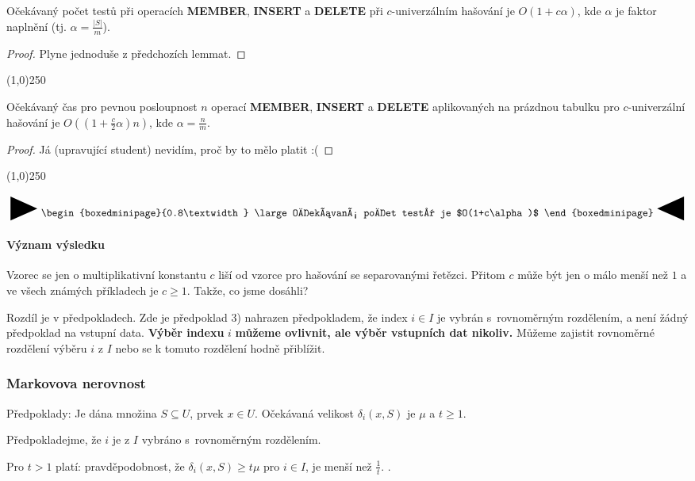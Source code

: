 \documentclass[a4paper,12pt]{article}
\newenvironment{myproof}{
  \begin{proof}
    
  }{
  \end{proof}
  \begin{center}
   \line(1,0){250}
   \end{center}
  }
\newcommand{\zapamatovat}[1]{
 {
 
 \setlength\fboxrule{5pt}
 \begin{center}
 $\vcenter{
 \hbox{\raisebox{-0.8ex}{\scalebox{1.7}{\Huge\RIGHTarrow}}\begin{boxedminipage}{0.8\textwidth}
\large #1
 \end{boxedminipage}\raisebox{-0.8ex}{\scalebox{1.7}{\Huge\LEFTarrow}}}}$
 \end{center}
 }
 }
\begin{document}
\begin{veta}Očekávaný počet testů při operacích {\bf MEMBER}, {\bf INSERT }
a {\bf DE\-LETE} při $c$-univerzálním hašování je $
O(1+c\alpha )$, kde 
$\alpha$ je faktor napl\-nění (tj. $\alpha =\frac {|S|}m$).
\end{veta}
\begin{myproof}
    Plyne jednoduše z předchozích lemmat.
\end{myproof}
\begin{veta}
Očekávaný čas pro pevnou posloupnost $n$ operací 
{\bf MEMBER}, {\bf INSERT} a {\bf DELETE} aplikovaných na prázdnou ta\-bulku 
pro $c$-univerzální hašování je $O((1+\frac c2\alpha 
)n)$, kde $\alpha =\frac nm$.  
\end{veta}
\begin{myproof}
    Já (upravující student) nevidím, proč by to mělo platit :(
\end{myproof}

\zapamatovat{
Očekávaný počet testů je $O(1+c\alpha )$
}

\paragraph{Význam výsledku}  Vzorec se jen o multiplikativní 
konstantu $c$ liší od vzorce pro hašování se separovanými 
řetězci.  Přitom $c$ může být jen o málo menší než $
1$ a 
ve všech známých příkla\-dech je $c\ge 1$.  Takže, co jsme 
dosáhli?  

Rozdíl je v předpokla\-dech.  Zde je předpoklad 3) 
nahrazen předpokladem, že index $i\in I$ je vybrán s~rovnoměrným rozdělením, a není žádný předpoklad na vstupní 
data.  {\bf Výběr indexu} $i$ {\bf můžeme ov\-liv\-nit, ale výběr 
vstupních dat nikoliv.}  Můžeme zajistit rovno\-měr\-né 
rozdělení výběru $i$ z $I$ nebo se k tomuto rozdělení hodně 
přiblížit.  

\subsubsection{Markovova nerovnost}

Předpoklady: Je dána množina $S\subseteq U$, prvek $
x\in U$. 
Očeká\-va\-ná velikost $\delta_i(x,S)$ je $\mu$ a $t\ge 
1$.

Předpokladejme, že $
i$ je z $I$ vybráno s~rovnoměrným rozdělením.
\begin{veta}
Pro $t>1$ platí: pravděpodobnost, že $
\delta_i(x,S)\ge t\mu$ 
pro $i\in I$, je menší než $\frac 1t$. .  
\end{veta}
\end{document}
